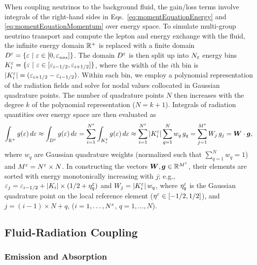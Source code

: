 \documentclass[10pt,preprint]{aastex}
\begin{document}
When coupling neutrinos to the background fluid, the gain/loss terms involve integrals of the right-hand sides in Eqs.~\eqref{eq:momentEquationEnergy} and \eqref{eq:momentEquationMomentum} over energy space.  
To simulate multi-group neutrino transport and compute the lepton and energy exchange with the fluid, the infinite energy domain $\mathbb{R}^{+}$ is replaced with a finite domain $D^{\varepsilon}=\{\varepsilon~|~\varepsilon\in[0,\varepsilon_{\mbox{\tiny max}}]\}$.  
The domain $D^{\varepsilon}$ is then split up into $N_{\varepsilon}$ energy bins $K_{i}^{\varepsilon}=\{\varepsilon~|~\varepsilon\in[\varepsilon_{i-1/2},\varepsilon_{i+1/2}]\}$, where the width of the $i$th bin is $|K_{i}^{\varepsilon}|=(\varepsilon_{i+1/2}-\varepsilon_{i-1/2})$.  
Within each bin, we employ a polynomial representation of the radiation fields and solve for nodal values collocated in Gaussian quadrature points.  
The number of quadrature points $N$ then increases with the degree $k$ of the polynomial representation ($N=k+1$).  
Integrals of radiation quantities over energy space are then evaluated as
\begin{equation}
  \int_{\mathbb{R}^{+}}g(\varepsilon)\,d\varepsilon
  \approx\int_{D^{\varepsilon}}g(\varepsilon)\,d\varepsilon
  =\sum_{i=1}^{N^{\varepsilon}}\int_{K_{i}^{\varepsilon}}g(\varepsilon)\,d\varepsilon
  \approx\sum_{i=1}^{N^{\varepsilon}}|K_{i}^{\varepsilon}|\sum_{q=1}^{N}w_{q}\,g_{q}=\sum_{j=1}^{M^{\varepsilon}} W_{j}\,g_{j}=\boldsymbol{W}\cdot\boldsymbol{g},
\end{equation}
where $w_{q}$ are Gaussian quadrature weights (normalized such that $\sum_{q=1}^{N}w_{q}=1$) and $M^{\varepsilon}=N^{\varepsilon}\times N$.  
In constructing the vectors $\boldsymbol{W},\boldsymbol{g}\in\mathbb{R}^{M^{\varepsilon}}$, their elements are sorted with energy monotonically increasing with $j$; e.g., $\varepsilon_{j}=\varepsilon_{i-1/2}+|K_{i}|\times(1/2+\eta_{q}^{\varepsilon})$ and $W_{j}=|K_{i}^{\varepsilon}|\,w_{q}$, where $\eta_{q}^{\varepsilon}$ is the Gaussian quadrature point on the local reference element ($\eta^{\varepsilon}\in[-1/2,1/2]$), and $j=(i-1)\times N+q$, ($i=1,\ldots,N^{\varepsilon}$, $q=1,\ldots,N$).  

\subsection{Fluid-Radiation Coupling}

\subsubsection{Emission and Absorption}
\end{document}

